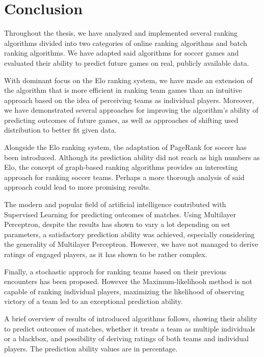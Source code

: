 \chapter{Conclusion}
\label{ch:conclusion}
Throughout the thesis, we have analyzed and implemented several ranking algorithms divided into two categories of online ranking algorithms and batch ranking algorithms. We have adapted said algorithms for soccer games and evaluated their ability to predict future games on real, publicly available data. 

With dominant focus on the Elo ranking system, we have made an extension of the algorithm that is more efficient in ranking team games than an intuitive approach based on the idea of perceiving teams as individual players. Moreover, we have demonstrated several approaches for improving the algorithm's ability of predicting outcomes of future games, as well as approaches of shifting used distribution to better fit given data.

Alongside the Elo ranking system, the adaptation of PageRank for soccer has been introduced. Although its prediction ability did not reach as high numbers as Elo, the concept of graph-based ranking algorithms provides an interesting approach for ranking soccer teams. Perhaps a more thorough analysis of said approach could lead to more promising results.

The modern and popular field of artificial intelligence contributed with Supervised Learning for predicting outcomes of matches. Using Multilayer Perceptron, despite the results has shown to vary a lot depending on set parameters, a satisfactory prediction ability was achieved, especially considering the generality of Multilayer Perceptron. However, we have not managed to derive ratings of engaged players, as it has shown to be rather complex.

Finally, a stochastic approch for ranking teams based on their previous encounters has been proposed. However the Maximum-likelihooh method is not capable of ranking individual players, maximizing the  likelihood of observing victory of a team led to an exceptional prediction ability.

A brief overview of results of introduced algorithms follows, showing their ability to predict outcomes of matches, whether it treats a team as multiple individuals or a blackbox, and possibility of deriving ratings of both teams and individual players. The prediction ability values are in percentage.

